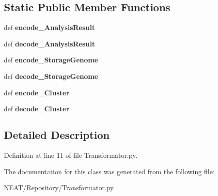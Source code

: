 \subsection*{Static Public Member Functions}
\begin{DoxyCompactItemize}
\item 
def {\bfseries encode\+\_\+\+Analysis\+Result}\hypertarget{class_n_e_a_t___py_genetics_1_1_n_e_a_t_1_1_repository_1_1_transformator_1_1_transformator_a930f3a38fe7754c4c4a950718cf6df99}{}\label{class_n_e_a_t___py_genetics_1_1_n_e_a_t_1_1_repository_1_1_transformator_1_1_transformator_a930f3a38fe7754c4c4a950718cf6df99}

\item 
def {\bfseries decode\+\_\+\+Analysis\+Result}\hypertarget{class_n_e_a_t___py_genetics_1_1_n_e_a_t_1_1_repository_1_1_transformator_1_1_transformator_afa3d18da2509741c7b98b86f6b867c93}{}\label{class_n_e_a_t___py_genetics_1_1_n_e_a_t_1_1_repository_1_1_transformator_1_1_transformator_afa3d18da2509741c7b98b86f6b867c93}

\item 
def {\bfseries encode\+\_\+\+Storage\+Genome}\hypertarget{class_n_e_a_t___py_genetics_1_1_n_e_a_t_1_1_repository_1_1_transformator_1_1_transformator_a5c4155f4acbb4c8cf532e1fccc9b2e47}{}\label{class_n_e_a_t___py_genetics_1_1_n_e_a_t_1_1_repository_1_1_transformator_1_1_transformator_a5c4155f4acbb4c8cf532e1fccc9b2e47}

\item 
def {\bfseries decode\+\_\+\+Storage\+Genome}\hypertarget{class_n_e_a_t___py_genetics_1_1_n_e_a_t_1_1_repository_1_1_transformator_1_1_transformator_acc9bbdb90961f5952e142967fadb8792}{}\label{class_n_e_a_t___py_genetics_1_1_n_e_a_t_1_1_repository_1_1_transformator_1_1_transformator_acc9bbdb90961f5952e142967fadb8792}

\item 
def {\bfseries encode\+\_\+\+Cluster}\hypertarget{class_n_e_a_t___py_genetics_1_1_n_e_a_t_1_1_repository_1_1_transformator_1_1_transformator_ae51de8a47210d94df0d81d170cd81998}{}\label{class_n_e_a_t___py_genetics_1_1_n_e_a_t_1_1_repository_1_1_transformator_1_1_transformator_ae51de8a47210d94df0d81d170cd81998}

\item 
def {\bfseries decode\+\_\+\+Cluster}\hypertarget{class_n_e_a_t___py_genetics_1_1_n_e_a_t_1_1_repository_1_1_transformator_1_1_transformator_a8671f5ca051f20dbdd948c8689a6019c}{}\label{class_n_e_a_t___py_genetics_1_1_n_e_a_t_1_1_repository_1_1_transformator_1_1_transformator_a8671f5ca051f20dbdd948c8689a6019c}

\end{DoxyCompactItemize}


\subsection{Detailed Description}


Definition at line 11 of file Transformator.\+py.



The documentation for this class was generated from the following file\+:\begin{DoxyCompactItemize}
\item 
N\+E\+A\+T/\+Repository/Transformator.\+py\end{DoxyCompactItemize}
